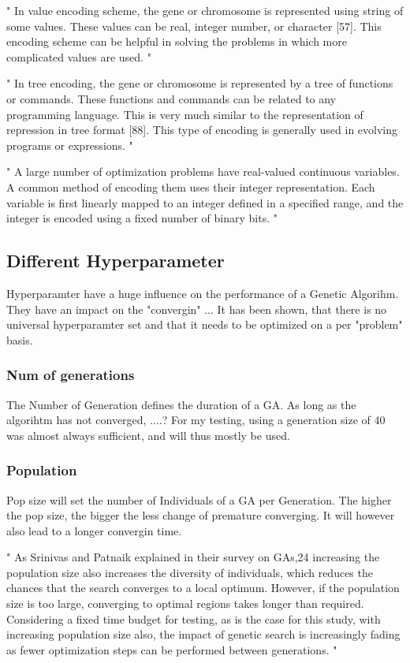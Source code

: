 "
In value encoding scheme, the gene or chromosome is represented using string of some values. These values can be real, integer number, or character [57]. This encoding scheme can be helpful in solving the problems in which more complicated values are used.
"\cite{katoch_review_2021}

"
In tree encoding, the gene or chromosome is represented by a tree of functions or commands. These functions and commands can be related to any programming language. This is very much similar to the representation of repression in tree format [88]. This type of encoding is generally used in evolving programs or expressions.
"\cite{katoch_review_2021}

"
A large number of optimization problems have real-valued continuous variables. A common method of encoding them uses their integer representation. Each variable is first linearly mapped to an integer defined in a specified range, and the integer is encoded using a fixed number of binary bits.
"\cite{srinivas_genetic_1994}

\subsection{Different Hyperparameter}
Hyperparamter have a huge influence on the performance of a Genetic Algorihm. They have an impact on the "convergin" ...
It has been shown, that there is no universal hyperparamter set and that it needs to be optimized on a per "problem" basis.

\subsubsection{Num of generations}
The Number of Generation defines the duration of a GA. As long as the algorihtm has not converged, ....?
For my testing, using a generation size of 40 was almost always sufficient, and will thus mostly be used.

\subsubsection{Population}
Pop size will set the number of Individuals of a GA per Generation. The higher the pop size, the bigger the less change of premature converging. 
It will however also lead to a longer convergin time.

"
As Srinivas and Patnaik explained in their survey on GAs,24 increasing the population size also increases the diversity of individuals, which reduces the chances that the search converges to a local optimum. However, if the population size is too large, converging to optimal regions takes longer than required. Considering a fixed time budget for testing, as is the case for this study, with increasing population size also, the impact of genetic search is increasingly fading as fewer optimization steps can be performed between generations.
"\cite{klampfl_using_nodate}



